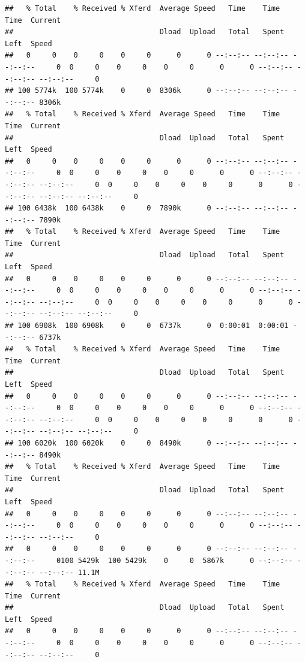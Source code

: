 \documentclass[
]{book}
\begin{document}
\begin{verbatim}
##   % Total    % Received % Xferd  Average Speed   Time    Time     Time  Current
##                                  Dload  Upload   Total   Spent    Left  Speed
##   0     0    0     0    0     0      0      0 --:--:-- --:--:-- --:--:--     0  0     0    0     0    0     0      0      0 --:--:-- --:--:-- --:--:--     0
## 100 5774k  100 5774k    0     0  8306k      0 --:--:-- --:--:-- --:--:-- 8306k
##   % Total    % Received % Xferd  Average Speed   Time    Time     Time  Current
##                                  Dload  Upload   Total   Spent    Left  Speed
##   0     0    0     0    0     0      0      0 --:--:-- --:--:-- --:--:--     0  0     0    0     0    0     0      0      0 --:--:-- --:--:-- --:--:--     0  0     0    0     0    0     0      0      0 --:--:-- --:--:-- --:--:--     0
## 100 6438k  100 6438k    0     0  7890k      0 --:--:-- --:--:-- --:--:-- 7890k
##   % Total    % Received % Xferd  Average Speed   Time    Time     Time  Current
##                                  Dload  Upload   Total   Spent    Left  Speed
##   0     0    0     0    0     0      0      0 --:--:-- --:--:-- --:--:--     0  0     0    0     0    0     0      0      0 --:--:-- --:--:-- --:--:--     0  0     0    0     0    0     0      0      0 --:--:-- --:--:-- --:--:--     0
## 100 6908k  100 6908k    0     0  6737k      0  0:00:01  0:00:01 --:--:-- 6737k
##   % Total    % Received % Xferd  Average Speed   Time    Time     Time  Current
##                                  Dload  Upload   Total   Spent    Left  Speed
##   0     0    0     0    0     0      0      0 --:--:-- --:--:-- --:--:--     0  0     0    0     0    0     0      0      0 --:--:-- --:--:-- --:--:--     0  0     0    0     0    0     0      0      0 --:--:-- --:--:-- --:--:--     0
## 100 6020k  100 6020k    0     0  8490k      0 --:--:-- --:--:-- --:--:-- 8490k
##   % Total    % Received % Xferd  Average Speed   Time    Time     Time  Current
##                                  Dload  Upload   Total   Spent    Left  Speed
##   0     0    0     0    0     0      0      0 --:--:-- --:--:-- --:--:--     0  0     0    0     0    0     0      0      0 --:--:-- --:--:-- --:--:--     0
##   0     0    0     0    0     0      0      0 --:--:-- --:--:-- --:--:--     0100 5429k  100 5429k    0     0  5867k      0 --:--:-- --:--:-- --:--:-- 11.1M
##   % Total    % Received % Xferd  Average Speed   Time    Time     Time  Current
##                                  Dload  Upload   Total   Spent    Left  Speed
##   0     0    0     0    0     0      0      0 --:--:-- --:--:-- --:--:--     0  0     0    0     0    0     0      0      0 --:--:-- --:--:-- --:--:--     0

\end{verbatim}
\end{document}
